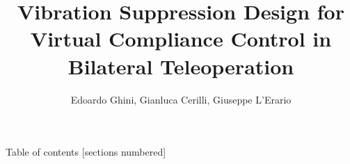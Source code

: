 \documentclass[10pt]{beamer}
\title{Vibration Suppression Design for Virtual Compliance Control in Bilateral Teleoperation}
\date{}
\author{Edoardo Ghini, Gianluca Cerilli, Giuseppe L'Erario}
\institute{La Sapienza University}
\begin{document}
	
	\maketitle
	
	\begin{frame}{Table of contents}
	[sections numbered]
	\tableofcontents[hideallsubsections]
\end{frame}





\appendix
\end{document}
